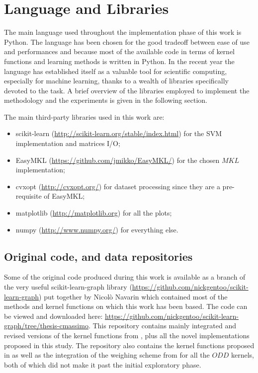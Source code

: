 \chapter{Language and Libraries}
\label{AppendixB}


The main language used throughout the implementation phase of this work is 
Python.
The language has been chosen for the good tradeoff between ease of use and
performances and because most of the available code in terms of kernel functions 
and learning methods is written in Python.
In the recent year the language has established itself as a valuable tool for
scientific computing, especially for machine learning, thanks to a wealth
of libraries specifically devoted to the task.
A brief overview of the libraries employed to implement the methodology
and the experiments is given in the following section.

The main third-party libraries used in this work are:
\begin{itemize}
    \item scikit-learn (\url{http://scikit-learn.org/stable/index.html}) for the
        SVM implementation and matrices I/O;
    \item EasyMKL (\url{https://github.com/jmikko/EasyMKL/}) for the chosen $MKL$
        implementation;
    \item cvxopt (\url{http://cvxopt.org/}) for dataset processing since they are
        a pre-requisite of EasyMKL;
    \item matplotlib (\url{http://matplotlib.org}) \cite{Hunter:2007} for all the plots;
    \item numpy (\url{http://www.numpy.org/}) for everything else.
\end{itemize}

\section{Original code, and data repositories}
\label{sec:repos}
Some of the original code produced during this work is available as a branch of the 
very useful scikit-learn-graph library (\url{https://github.com/nickgentoo/scikit-learn-graph})
put together by Nicol\`o Navarin which contained most of the methods and kernel
functions on which this work has been based.
The code can be viewed and downloaded here: \url{https://github.com/nickgentoo/scikit-learn-graph/tree/thesis-cmassimo}.
This repository contains mainly integrated and revised versions of the kernel functions from \cite{rtesselli},
plus all the novel implementations proposed in this study.
The repository also contains the kernel functions proposed in \cite{SanMartino2014}
as well as the integration of the weighing scheme from \cite{DaSanMartino2016} for all the $ODD$ kernels,
both of which did not make it past the initial exploratory phase.

